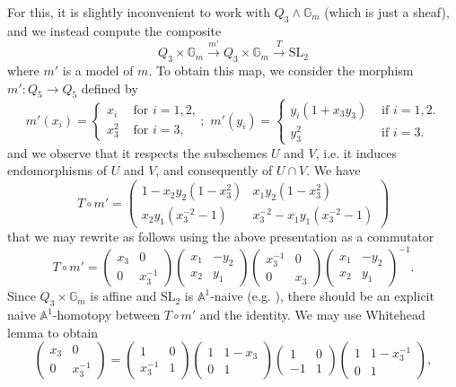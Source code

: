 \documentclass[11pt,leqno]{article}
\newcommand{\A}{{\mathbb A}}
\renewcommand{\1}{{\rm 1\hspace*{-0.4ex}%
\rule{0.1ex}{1.52ex}\hspace*{0.2ex}}}
\newcommand{\gm}{{{\mathbb G}_{m}}}
\newcommand{\<}[1]{{\langle}#1 {\rangle}}
\theoremstyle{plain}
\theoremstyle{definition}
\theoremstyle{remark}
\numberwithin{equation}{section}
\begin{document}
For this, it is slightly inconvenient to work with $Q_3\wedge \gm{}$ (which is just a sheaf), and we instead compute the composite
\[
Q_3\times \gm{}\xrightarrow{m'}Q_3\times \gm{}\xrightarrow{T} \mathrm{SL}_2
\]
where $m'$ is a model of $m$. To obtain this map, we consider the morphism $m'\colon Q_5\to Q_5$ defined by
\[
m'(x_i)=\begin{cases} x_i & \text{ for $i=1,2$,} \\ x_3^2 & \text{ for $i=3$,}\end{cases}; \phantom{i} m'(y_i)=\begin{cases} y_i(1+x_3y_3) & \text{ if $i=1,2$.} \\ y_3^2 & \text{ if $i=3$.}\end{cases}
\]
and we observe that it respects the subschemes $U$ and $V$, i.e. it induces endomorphisms of $U$ and $V$, and consequently of $U\cap V$. 
We have 
\[
T\circ m'=\begin{pmatrix} 1-x_2y_2(1-x_3^2) & x_1y_2(1-x_3^2) \\ x_2y_1(x_3^{-2}-1) & x_3^{-2}-x_1y_1(x_3^{-2}-1)\end{pmatrix}
\]
that we may rewrite as follows using the above presentation as a commutator
\[
T\circ m'=\begin{pmatrix} x_3 & 0 \\ 0 & x_3^{-1}\end{pmatrix}\begin{pmatrix} x_1 & -y_2 \\ x_2 & y_1\end{pmatrix}\begin{pmatrix} x_3^{-1} & 0 \\ 0 & x_3\end{pmatrix}\begin{pmatrix} x_1 & -y_2 \\ x_2 & y_1\end{pmatrix}^{-1}.
\]
Since $Q_3\times\gm{}$ is affine and $\mathrm{SL}_2$ is $\A^1$-naive (e.g. \cite{Asok15a}), there should be an explicit naive $\A^1$-homotopy between $T\circ m'$ and the identity. We may use Whitehead lemma to obtain
\[
\begin{pmatrix} x_3 & 0 \\ 0 & x_3^{-1}\end{pmatrix}=\begin{pmatrix} 1 & 0 \\ x_3^{-1} & 1\end{pmatrix}\begin{pmatrix} 1 & 1-x_3  \\ 0 & 1\end{pmatrix}\begin{pmatrix} 1 & 0 \\ -1 & 1\end{pmatrix}\begin{pmatrix} 1 & 1-x_3^{-1}  \\ 0 & 1\end{pmatrix},
\]
\end{document}
